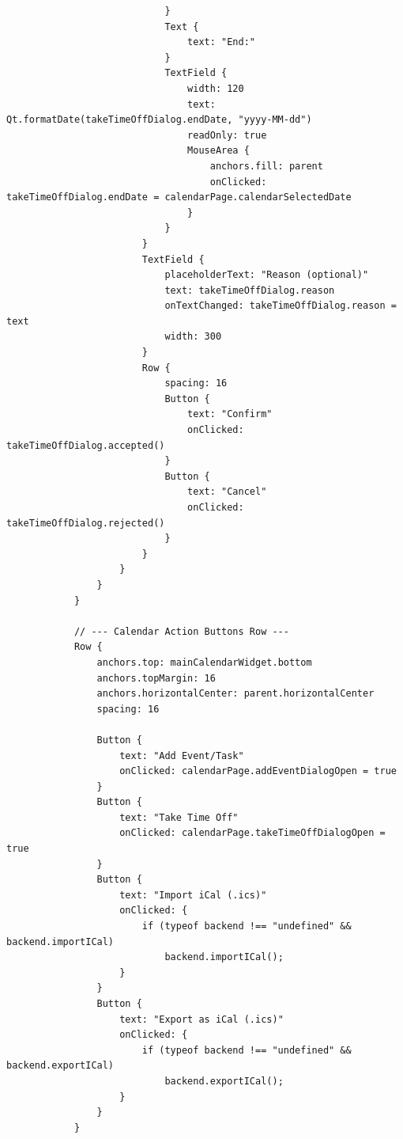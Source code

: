 \documentclass{report}
\begin{document}
\begin{lstlisting}
                            }
                            Text {
                                text: "End:"
                            }
                            TextField {
                                width: 120
                                text: Qt.formatDate(takeTimeOffDialog.endDate, "yyyy-MM-dd")
                                readOnly: true
                                MouseArea {
                                    anchors.fill: parent
                                    onClicked: takeTimeOffDialog.endDate = calendarPage.calendarSelectedDate
                                }
                            }
                        }
                        TextField {
                            placeholderText: "Reason (optional)"
                            text: takeTimeOffDialog.reason
                            onTextChanged: takeTimeOffDialog.reason = text
                            width: 300
                        }
                        Row {
                            spacing: 16
                            Button {
                                text: "Confirm"
                                onClicked: takeTimeOffDialog.accepted()
                            }
                            Button {
                                text: "Cancel"
                                onClicked: takeTimeOffDialog.rejected()
                            }
                        }
                    }
                }
            }

            // --- Calendar Action Buttons Row ---
            Row {
                anchors.top: mainCalendarWidget.bottom
                anchors.topMargin: 16
                anchors.horizontalCenter: parent.horizontalCenter
                spacing: 16

                Button {
                    text: "Add Event/Task"
                    onClicked: calendarPage.addEventDialogOpen = true
                }
                Button {
                    text: "Take Time Off"
                    onClicked: calendarPage.takeTimeOffDialogOpen = true
                }
                Button {
                    text: "Import iCal (.ics)"
                    onClicked: {
                        if (typeof backend !== "undefined" && backend.importICal)
                            backend.importICal();
                    }
                }
                Button {
                    text: "Export as iCal (.ics)"
                    onClicked: {
                        if (typeof backend !== "undefined" && backend.exportICal)
                            backend.exportICal();
                    }
                }
            }


\end{lstlisting}
\end{document}
